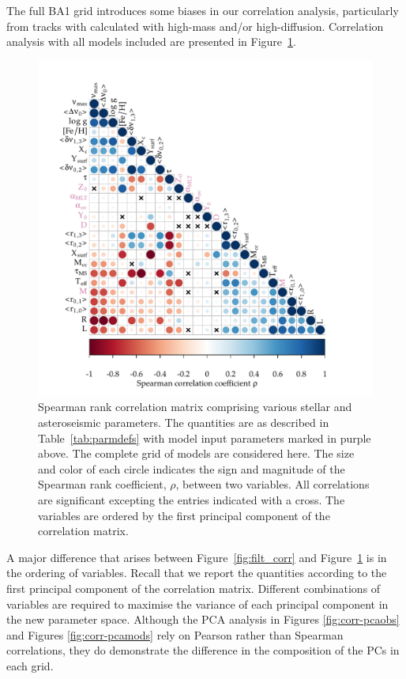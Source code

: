 The full BA1 grid introduces some biases in our correlation analysis, particularly from tracks with calculated with  high-mass and/or high-diffusion. Correlation analysis with all models included are presented in Figure~\ref{fig:corr}. 
\begin{figure}
    \centering
    \includegraphics[trim={1cm 0 2cm 1cm},clip,
    width=\textwidth]{corr-spearman.pdf}
    \caption[]{Spearman rank correlation matrix comprising various stellar and asteroseismic parameters. The quantities are as described in Table~\ref{tab:parmdefs}
    with model input parameters marked in purple above. The complete grid of models are considered here. The size and color of each circle indicates the sign and magnitude of the Spearman rank coefficient, $\rho$, between two variables.  All correlations are significant excepting the entries indicated with a cross. The variables are ordered by the first principal component of the correlation matrix. }
    \label{fig:corr}
\end{figure}

A major difference that arises between Figure~\ref{fig:filt_corr} and Figure~\ref{fig:corr} is in the ordering of variables. Recall that we report the quantities according to the first principal component of the correlation matrix. Different combinations of variables are required to maximise the variance of each principal component in the new parameter space. Although the PCA analysis in Figures \ref{fig:corr-pcaobs} and Figures \ref{fig:corr-pcamods} rely on Pearson rather than Spearman correlations, they do demonstrate the difference in the composition of the PCs in each grid. 

